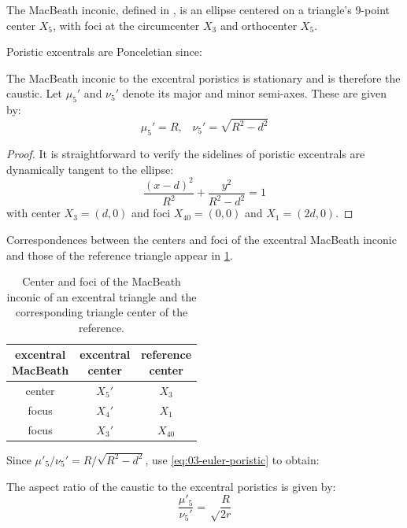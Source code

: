 The MacBeath inconic, defined in \cite[MacBeath Inconic]{mw}, is an ellipse centered on a triangle's 9-point center $X_5$, with  foci at the circumcenter $X_3$ and orthocenter $X_5$.

Poristic excentrals are Ponceletian since:

\begin{proposition}
The MacBeath inconic to the excentral poristics is stationary and is therefore the caustic. Let $\mu_5'$ and $\nu_5'$ denote its major and minor semi-axes. These are given by:
\[ \mu_5'=R,\;\;\;\nu_5'=\sqrt{R^2-d^2} \]
\end{proposition}

\begin{proof}
It is straightforward to verify the sidelines of poristic excentrals are dynamically  tangent to the ellipse:
\[
\frac{(x-d)^2}{R^2}+\frac{y^2}{R^2-d^2}=1\]
with center $X_3=(d,0)$ and foci $X_{40}=(0,0)$ and $X_1=(2d,0)$.
\end{proof}

Correspondences between the centers and foci of the excentral MacBeath inconic and those of the reference triangle appear in \cref{tab:03-macbeath}.

\begin{table}
\centering
\begin{tabular}{|c|c|c|}
\hline
\makecell[cc]{excentral\\ MacBeath} &
\makecell[cc]{excentral\\center} &
\makecell[cc]{reference\\center} \\
\hline
center & $X_5'$ & $X_3$\\
focus & $X_4'$ & $X_1$  \\
focus & $X_3'$ & $X_{40}$ \\
\hline
\end{tabular}
\caption{Center and foci of the MacBeath inconic of an excentral triangle and the corresponding triangle center of the reference.} 
\label{tab:03-macbeath}
\end{table}

Since $\mu'_5/\nu_5'=R/\sqrt{R^2-d^2}$, use \cref{eq:03-euler-poristic} to obtain:

\begin{corollary}
The aspect ratio of the caustic to the excentral poristics is given by:
\begin{equation*}
 \frac{\mu'_5}{\nu_5'}={\sqrt\frac{R}{2 r}}
\end{equation*}
\end{corollary}


